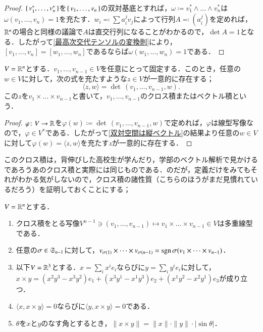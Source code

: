 \begin{proof}
$\set{v_1^*, \dots, v_n^*}$を$\set{v_1, \dots ,v_n}$の双対基底とすれば，$\omega \coloneqq v_1^* \wedge \dots \wedge v_n^*$は$\omega(v_1, \dots ,v_n) = 1$を充たす．$w_i \eqqcolon \sum a_i^j v_j$によって行列$A \eqqcolon \left(a_i^j\right)$を定めれば，$\mathbb{R}^n$の場合と同様の議論で$A$は直交行列になることがわかるので，$\det A = 1$となる．したがって\cref{最高次交代テンソルの変換則}により，$[v_1, \dots, v_n] = [w_1, \dots, w_n]$であるならば$\omega(w_1, \dots, w_n) = 1$である．
\end{proof}

\begin{prop}
$V = \mathbb{R}^n$とする．$v_1, \dots, v_{n-1} \in V$を任意にとって固定する．このとき，任意の$w \in V$に対して，次の式を充たすような$z \in V$が一意的に存在する；
\begin{equation}
\langle z,w \rangle = \det\, (v_1, \dots, v_{n-1}, w).
\end{equation}この$z$を$v_1 \times \dots \times v_{n-1}$と書いて，$v_1, \dots, v_{n-1}$のクロス積またはベクトル積という．
\end{prop}

\begin{proof}
$\varphi \colon V \to \mathbb{R}$を$\varphi(w) \coloneqq \det\, (v_1, \dots, v_{n-1}, w)$で定めれば，$\varphi$は線型写像なので，$\varphi \in V^*$である．したがって\cref{双対空間は縦ベクトル}の結果より任意の$w \in V$に対して$\varphi(w) = \langle z,w \rangle$を充たす$z$が一意的に存在する．
\end{proof}

このクロス積は，背伸びした高校生が学んだり，学部のベクトル解析で見かけるであろうあのクロス積と実際には同じものである．のだが，定義だけをみてもそれがわかる気がしないので，クロス積の諸性質（こちらのほうがまだ見慣れているだろう）を証明しておくことにする；

\begin{prop}[クロス積の基本性質]$V = \mathbb{R}^n$とする．
\begin{enumerate}
\item クロス積をとる写像$V^{n-1} \ni (v_1, \dots, v_{n-1}) \mapsto v_1 \times \dots \times v_{n-1} \in V$は多重線型である．
\item 任意の$\sigma \in \mathfrak{S}_{n-1}$に対して，$v_{\sigma(1)} \times \dots \times v_{\sigma(n-1)} = \operatorname{sgn} \sigma (v_1 \times \dots \times v_{n-1})$．
\item 以下$V=\mathbb{R}^3$とする．$x = \sum_i x^i e_i$ならびに$y = \sum_i y^i e_i$に対して，$x \times y = (x^2y^3 - x^3y^2)e_1 + (x^3y^1 - x^1y^3)e_2 + (x^1y^2 - x^2y^1)e_3$が成り立つ．
\item $\langle x, x \times y \rangle = 0$ならびに$\langle y, x \times y \rangle = 0$である．
\item $\theta$を$x$と$y$のなす角とするとき，$\|x \times y\| = \|x\| \cdot \|y\| \cdot \lvert \sin \theta \rvert$．
\end{enumerate}
\end{prop}

